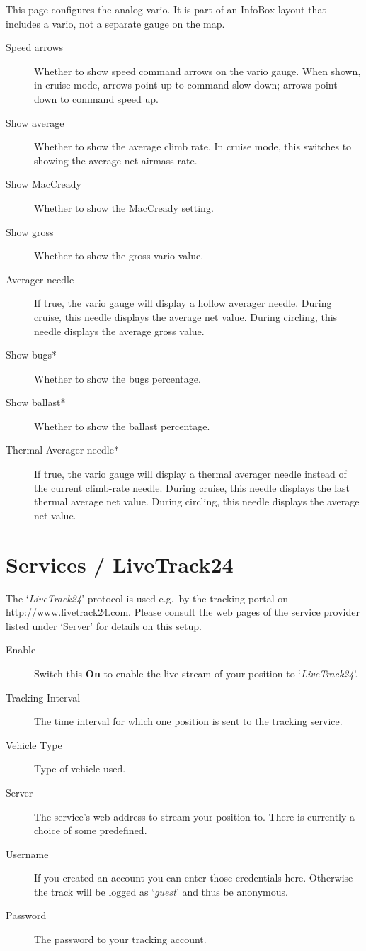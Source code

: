 This page configures the analog vario. It is part of an InfoBox layout
that includes a vario, not a separate gauge on the map.

\begin{description}
\item[Speed arrows]  \label{conf:variogauge} Whether to show speed command
  arrows on the vario gauge.
  When shown, in cruise mode, arrows point up to command slow down; arrows point down
  to command speed up.
\item[Show average]  Whether to show the average climb rate.  In cruise mode, this
  switches to showing the average net airmass rate.
\item[Show MacCready]  Whether to show the MacCready setting.
\item[Show gross]  Whether to show the gross vario value.
\item[Averager needle]  If true, the vario gauge will display a hollow averager
  needle. During cruise, this needle displays the average net value. During circling,
  this needle displays the average gross value.
\item[Show bugs*]  Whether to show the bugs percentage.
\item[Show ballast*]  Whether to show the ballast percentage.
\item[Thermal Averager needle*]  If true, the vario gauge will display a thermal
  averager needle instead of the current climb-rate needle. During cruise, this
  needle displays the last thermal average net value. During circling, this
  needle displays the average net value.
\end{description}


\section{Services / LiveTrack24}

The `{\em LiveTrack24}' protocol is used e.g.\ by the tracking portal on
\url{http://www.livetrack24.com}.
Please consult the web pages of the service provider listed under `Server'
for details on this setup.

\begin{description}
\item[Enable]  Switch this {\bf On} to enable the live stream of 
  your position to `{\em LiveTrack24}'.
\item[Tracking Interval]  The time interval for which one position is sent to
  the tracking service.
\item[Vehicle Type]  Type of vehicle used.
\item[Server]  The service's web address to stream your position to. There is currently 
  a choice of some predefined.
\item[Username]  If you created an account you can enter those credentials here. 
  Otherwise the track will be logged as `{\it guest}' and thus be anonymous.  
\item[Password]  The password to your tracking account.
\end{description}


